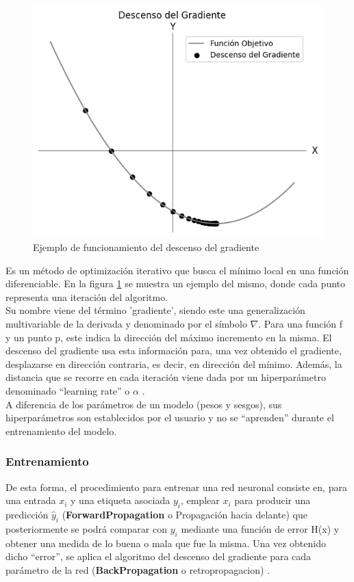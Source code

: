 \begin{figure}[H]
	\centering
	\includegraphics[scale=0.4]{imagenes/sgd.jpg}  
	\caption{Ejemplo de funcionamiento del descenso del gradiente}
	\label{fig:SGD}
\end{figure}

Es un método de optimización iterativo que busca el mínimo local en una función diferenciable. En la figura \ref{fig:SGD} se muestra un ejemplo del mismo, donde cada punto representa una iteración del algoritmo. \\
Su nombre viene del término 'gradiente', siendo este una generalización multivariable de la derivada y denominado por el símbolo $\nabla$. Para una función f y un punto p, este indica la dirección del máximo incremento en la misma. El descenso del gradiente usa esta información para, una vez obtenido el gradiente, desplazarse en dirección contraria, es decir, en dirección del mínimo. Además, la distancia que se recorre en cada iteración viene dada por un hiperparámetro denominado ``learning rate'' o $\alpha$ \cite{SGD_1} \cite{Gradiente} \cite{SGD_2}. \\
A diferencia de los parámetros de un modelo (pesos y sesgos), sus hiperparámetros son establecidos por el usuario y no se ``aprenden'' durante el entrenamiento del modelo.


\subsubsection{Entrenamiento}
De esta forma, el procedimiento para entrenar una red neuronal consiste en, para una entrada $x_i$ y una etiqueta asociada $y_i$, emplear $x_i$ para producir una predicción $\hat{y}_i$ (\textbf{ForwardPropagation} o Propagación hacia delante) que posteriormente se podrá comparar con $y_i$ mediante una función de error H(x) y obtener una medida de lo buena o mala que fue la misma. Una vez obtenido dicho ``error'', se aplica el algoritmo del descenso del gradiente para cada parámetro de la red (\textbf{BackPropagation} o retropropagacion) \cite{Cross_entropy}. \\

